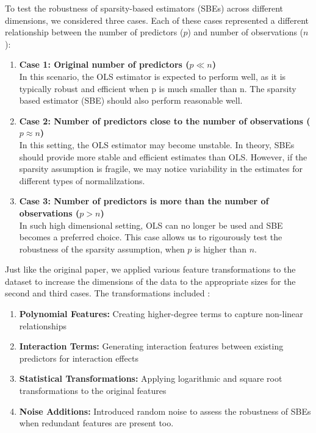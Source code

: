 To test the robustness of sparsity-based estimators (SBEs) across different dimensions, we considered three cases. Each of these cases represented a different relationship between the number of predictors ($p$) and number of observations ($n$): 
\begin{enumerate}
        \item \textbf{Case 1: Original number of predictors ($p \ll n$)}\\
        In this scenario, the OLS estimator is expected to perform well, as it is typically robust and efficient when p is much smaller than n. The sparsity based estimator (SBE) should also perform reasonable well. 
        \item \textbf{Case 2: Number of predictors close to the number of observations ($p \approx n$)}\\
        In this setting, the OLS estimator may become unstable. In theory, SBEs should provide more stable and efficient estimates than OLS. However, if the sparsity assumption is fragile, we may notice variability in the estimates for different types of normalilzations. 
        \item \textbf{Case 3: Number of predictors is more than the number of observations ($p > n$)}\\
        In such high dimensional setting, OLS can no longer be used and SBE becomes a preferred choice. This case allows us to rigourously test the robustness of the sparsity assumption, when $p$ is higher than $n$. 
    \end{enumerate}

Just like the original paper, we applied various feature transformations to the dataset to increase the dimensions of the data to the appropriate sizes for the second and third cases. The  transformations included :
\begin{enumerate}
    \item \textbf{Polynomial Features:} Creating higher-degree terms to capture non-linear relationships
    \item \textbf{Interaction Terms:} Generating interaction features between existing predictors for interaction effects
    \item \textbf{Statistical Transformations:} Applying logarithmic and square root transformations to the original features
    \item \textbf{Noise Additions:} Introduced random noise to assess the robustness of SBEs when redundant features are present too.
\end{enumerate}\\


